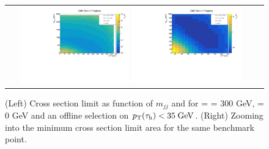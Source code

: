 \begin{figure}[tbh!]
	\centering
	\begin{tabular}{cc}
		\includegraphics[width=0.45\textwidth]{analysis/pics/JetInvMass_vs_MET_xsec_chi300_lsp000_taupt35.pdf}
		\includegraphics[width=0.45\textwidth]{analysis/pics/JetInvMass_vs_MET_xsec_chi300_lsp000_taupt35_zoom.pdf}
	\end{tabular}
	\caption{(Left) Cross section limit as function of $m_{jj}$ and \met for \charginopm = \neutralinotwo = 300 GeV, \neutralinoone = 0 GeV and an offline selection on $p_{\text{T}}(\tau_{\text{h}}) <  35\;\text{Ge}\kern-0.06667em\text{V}$. (Right) Zooming into the minimum cross section limit area for the same benchmark point.}
	\label{fig::JetInvMass_vs_MET_xsec_chi300_lsp000_taupt35}
\end{figure}

